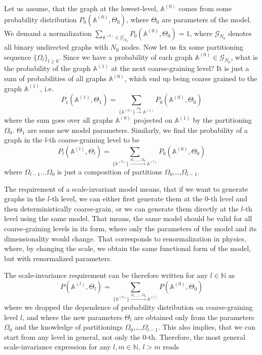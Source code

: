 Let us assume, that the graph at the lowest-level, $\mathbb{A}^{(0)}$ comes from some probability distribution $P_0(\mathbb{A}^{(0)}, \Theta_0)$, where $\Theta_0$ are parameters of the model. We demand a normalization $\sum_{\mathbb{A}^{(0)} \in \mathcal{G}_{N_0}}P_0(\mathbb{A}^{(0)}, \Theta_0) = 1$, where $\mathcal{G}_{N_0}$ denotes all binary undirected graphs with $N_0$ nodes. Now let us fix some partitioning sequence $\{\Omega_l\}_{l\geq0}$. Since we have a probability of each graph $\mathbb{A}^{(0)} \in \mathcal{G}_{N_0}$, what is the probability of the graph $\mathbb{A}^{(1)}$ at the next coarse-graining level? It is just a sum of probabilities of all graphs $\mathbb{A}^{(0)}$, which end up being coarse grained to the graph $\mathbb{A}^{(1)}$, i.e. \begin{equation}
    P_1(\mathbb{A}^{(1)}, \Theta_1) = \sum_{\{\mathbb{A}^{(0)}\} \xrightarrow{\Omega_0} \mathbb{A}^{(1)}} P_0(\mathbb{A}^{(0)}, \Theta_0)
\end{equation}
where the sum goes over all graphs $\mathbb{A}^{(0)}$ projected on $\mathbb{A}^{(1)}$ by the partitioning $\Omega_0$. $\Theta_1$ are some new model parameters. Similarly, we find the probability of a graph in the $l$-th coarse-graining level to be
\begin{equation}
    P_l(\mathbb{A}^{(l)}, \Theta_l) = \sum_{\{\mathbb{A}^{(0)}\} \xrightarrow{\Omega_{l-1}\dots\Omega_0} \mathbb{A}^{(l)}} P_0(\mathbb{A}^{(0)}, \Theta_0)
\end{equation}
where $\Omega_{l-1}\dots\Omega_0$ is just a composition of partitions $\Omega_{0}$,\dots,$\Omega_{l-1}$. 

The requirement of a scale-invariant model means, that if we want to generate graphs in the $l$-th level, we can either first generate them at the 0-th level and then deterministically coarse-grain, or we can generate them directly at the $l$-th level using the same model. That means, the same model should be valid for all coarse-graining levels in its form, where only the parameters of the model and its dimensionality would change. That corresponds to renormalization in physics, where, by changing the scale, we obtain the same functional form of the model, but with renormalized parameters.

The scale-invariance requirement can be therefore written for any $l \in \mathbb{N}$ as
\begin{equation}
    P(\mathbb{A}^{(l)}, \Theta_l) = \sum_{\{\mathbb{A}^{(0)}\} \xrightarrow{\Omega_{l-1}\dots\Omega_0} \mathbb{A}^{(l)}} P(\mathbb{A}^{(0)}, \Theta_0)
\end{equation}
where we dropped the dependence of probability distribution on coarse-graining level $l$, and where the new parameters $\Theta_l$ are obtained only from the parameters $\Omega_0$ and the knowledge of partitionings $\Omega_{0}$,\dots,$\Omega_{l-1}$. This also implies, that we can start from any level in general, not only the 0-th. Therefore, the most general scale-invariance expression for any $l,m\in\mathbb{N}$, $l>m$ reads

